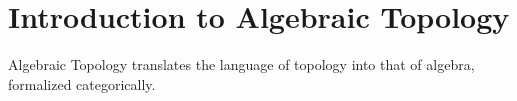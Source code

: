 \section{Introduction to Algebraic Topology}

Algebraic Topology translates the language of topology into that of algebra, formalized categorically.




